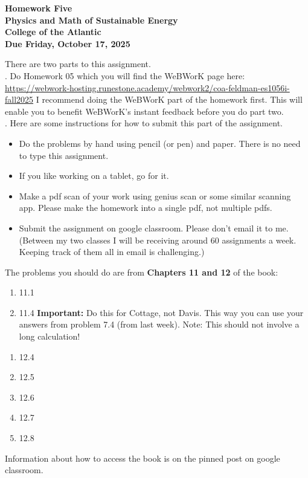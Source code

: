 \documentclass[12pt]{article}
\begin{document}
\pagestyle{empty}
 
\begin{center}
{\LARGE {\bf Homework Five}}\\
\bigskip
{\Large {\bf Physics and Math of Sustainable Energy}}\\
\bigskip
{\Large {\bf College of the Atlantic}}\\
\bigskip
{ {\bf Due Friday, October 17, 2025}}\\ 
\end{center}
\medskip


\noindent There are two parts to this assignment.\\

.  Do Homework 05 which you
will find the WeBWorK page here:
\url{https://webwork-hosting.runestone.academy/webwork2/coa-feldman-es1056i-fall2025}
I recommend doing the WeBWorK part of the homework first.  This will
enable you to benefit WeBWorK's instant feedback before you do part
two.\\ 


.  Here are some
instructions for how to submit this part of the assignment.
\begin{itemize}
\item Do the problems by hand using pencil (or pen) and paper.
  There is no need to type this assignment.
\item If you like working on a tablet, go for it. 
\item Make a pdf scan of your work using genius scan or some
  similar scanning app.  Please make the homework into a single
  pdf, not multiple pdfs.
\item Submit the assignment on google classroom.  Please don't
  email it to me.  (Between my two classes I will be receiving
  around 60 assignments a week.  Keeping track of them all in email 
  is challenging.)\\
\end{itemize}



\noindent The problems you should do are from {\bf Chapters
  11 and 12} of the book:  \\ 



\begin{enumerate}
\setlength{\itemsep}{-1mm}
\item 11.1
\item 11.4 {\bf Important:} Do this for Cottage, not Davis. This way
  you can use your answers from problem 7.4 (from last week). Note:
  This should not involve a long calculation!\\ 
\end{enumerate}


\begin{enumerate}
  \setlength{\itemsep}{-1mm}
\item 12.4 
\item 12.5
\item 12.6
\item 12.7
\item 12.8
\end{enumerate}


\noindent Information about how to access the book is on the
pinned post on google classroom. 
\end{document}
